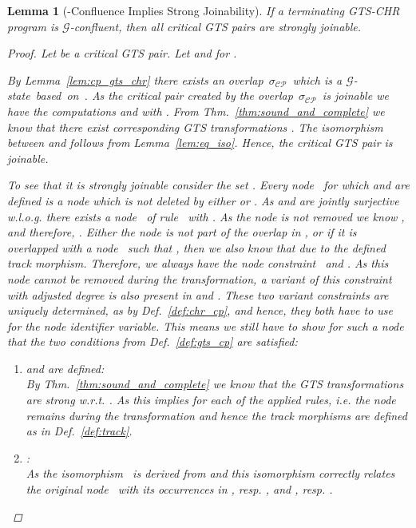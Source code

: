\documentclass{tlp}
\newtheorem{lemma}[theorem]{Lemma}
\newcommand{\mcCP}{\ensuremath{\mathcal{CP}}}
\newcommand{\mcG}{\ensuremath{\mathcal{G}}}
\newcommand{\sigcp}{\ensuremath{\sigma_{\mcCP}}}
\begin{document}
\begin{lemma}[-Confluence Implies Strong Joinability]
\label{lem:confluence_chr_gts}
If a terminating GTS-CHR program is \mcG-confluent, then all critical GTS pairs
are strongly joinable.

\begin{proof}
Let  be a critical GTS pair. Let  and  for .

By Lemma~\ref{lem:cp_gts_chr} there exists an overlap~\sigcp\ which is a
\mcG-state~based~on~. As the critical pair  created by
the overlap~\sigcp\ is joinable we have the computations  and  with . From Thm.~\ref{thm:sound_and_complete} we know that there exist
corresponding GTS transformations . The isomorphism between  and 
follows from Lemma~\ref{lem:eq_iso}. Hence, the critical GTS pair is joinable.

To see that it is strongly joinable consider the set . Every
node~ for which  and 
are defined is a node which is not deleted by either  or . As  and
 are jointly surjective w.l.o.g. there exists a node~ of
rule~ with . As the node is not removed we know ,
and therefore, . Either the
node is not part of the overlap in , or if it is overlapped with a
node~ such that , then we also know that  due to the defined track morphism. Therefore, we always have the
node constraint~ and . As this node cannot be removed during the transformation, a
variant of this constraint with adjusted degree is also present in  and
. These two variant constraints are uniquely determined, as  by Def.~\ref{def:chr_cp}, and hence, they both have to use  for
the node identifier variable. This means we still have to show for such a
node~ that the two conditions from Def.~\ref{def:gts_cp} are satisfied:
\begin{enumerate}
  \item  and  are defined:\\
  By Thm.~\ref{thm:sound_and_complete} we know that the GTS transformations are strong
  w.r.t. . As  this implies  for each of the applied rules, i.e. the node remains
  during the transformation and hence the track morphisms are defined as in
  Def.~\ref{def:track}.

  \item :\\
  As the isomorphism~ is derived from  and  this isomorphism correctly relates the original node~ with its
  occurrences in , resp. , and , resp.
  .\end{enumerate}\end{proof}
\end{lemma}
\end{document}
